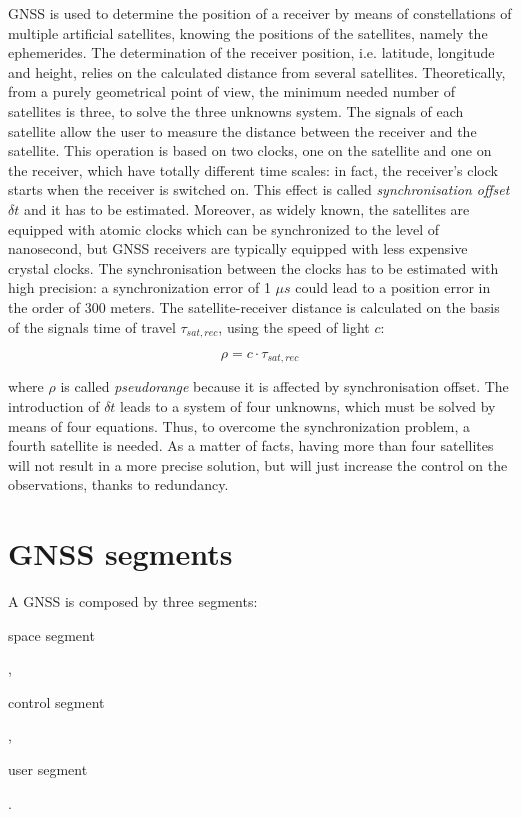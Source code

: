 GNSS is used to determine the position of a receiver by means of constellations of multiple artificial satellites, knowing the positions of the satellites, namely the ephemerides. The determination of the receiver position, i.e. latitude, longitude and height, relies on the calculated distance from several satellites. Theoretically, from a purely geometrical point of view, the minimum needed number of satellites is three, to solve the three unknowns system. The signals of each satellite allow the user to measure the distance between the receiver and the satellite. This operation is based on two clocks, one on the satellite and one on the receiver, which have totally different time scales: in fact, the receiver's clock starts when the receiver is switched on. This effect is called \textit{synchronisation offset} $\delta t$ and it has to be estimated. Moreover, as widely known, the satellites are equipped with atomic clocks which can be synchronized to the level of nanosecond, but GNSS receivers are typically equipped with less expensive crystal clocks. The synchronisation between the clocks has to be estimated with high precision: a synchronization error of 1 $\mu s$ could lead to a position error in the order of 300 meters. The satellite-receiver distance is calculated on the basis of the signals time of travel $ \tau_{sat,rec}$, using the speed of light $c$:

\begin{equation}
	\rho = c \cdot \tau_{sat,rec}
	\label{eq:pseudorange}
\end{equation}

where $\rho$ is called \textit{pseudorange} because it is affected by synchronisation offset. The introduction of $\delta t$ leads to a system of four unknowns, which must be solved by means of four equations. Thus, to overcome the synchronization problem, a fourth satellite is needed. As a matter of facts, having more than four satellites will not result in a more precise solution, but will just increase the control on the observations, thanks to redundancy.

\section{GNSS segments}

A GNSS is composed by three segments:
\begin{itemize}
	{\item[-] space segment},
	{\item[-] control segment},
	{\item[-] user segment}.
\end{itemize}

